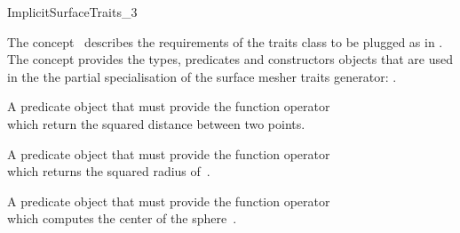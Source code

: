 

\begin{ccRefConcept}{ImplicitSurfaceTraits_3}

\ccDefinition
  
The concept \ccRefName\  describes the requirements of the traits class to
be plugged  as  in .
The concept provides the types, predicates and constructors objects
that are  used in the 
the partial specialisation  of 
the  surface mesher traits generator:
.




\ccTypes

\ccGlue
{}
\ccGlue
{}
\ccGlue
{}
\ccGlue
{}
\ccGlue
{}
\ccGlue
{}


{A predicate object that must provide the function operator\\
 which return the squared distance
between two points.}

{A predicate object that must provide the function operator\\
 which returns the squared radius
of~.}


{A predicate object that must provide the function operator\\
 which computes the center of
the sphere~.}


\end{ccRefConcept}
